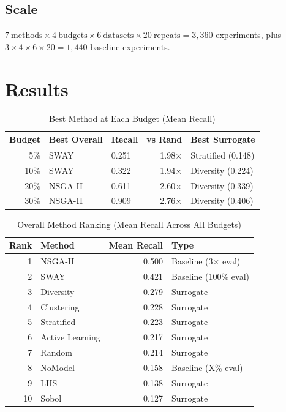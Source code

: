 \documentclass[conference]{IEEEtran}
\begin{document}
\subsection{Scale}

$7~\text{methods} \times 4~\text{budgets} \times 6~\text{datasets} \times 20~\text{repeats} = 3{,}360$ experiments, plus $3 \times 4 \times 6 \times 20 = 1{,}440$ baseline experiments.

\section{Results}
\label{sec:results}

\begin{table}[htbp]
\caption{Best Method at Each Budget (Mean Recall)}
\label{tab:best}
\centering
\begin{tabular}{rllrl}
\toprule
Budget & Best Overall & Recall & vs Rand & Best Surrogate \\
\midrule
5\% & SWAY & 0.251 & 1.98$\times$ & Stratified (0.148) \\
10\% & SWAY & 0.322 & 1.94$\times$ & Diversity (0.224) \\
20\% & NSGA-II & 0.611 & 2.60$\times$ & Diversity (0.339) \\
30\% & NSGA-II & 0.909 & 2.76$\times$ & Diversity (0.406) \\
\bottomrule
\end{tabular}
\end{table}

\begin{table}[htbp]
\caption{Overall Method Ranking (Mean Recall Across All Budgets)}
\label{tab:ranking}
\centering
\begin{tabular}{rlrl}
\toprule
Rank & Method & Mean Recall & Type \\
\midrule
1 & NSGA-II & 0.500 & Baseline (3$\times$ eval) \\
2 & SWAY & 0.421 & Baseline (100\% eval) \\
\midrule
3 & Diversity & 0.279 & Surrogate \\
4 & Clustering & 0.228 & Surrogate \\
5 & Stratified & 0.223 & Surrogate \\
6 & Active Learning & 0.217 & Surrogate \\
7 & Random & 0.214 & Surrogate \\
\midrule
8 & NoModel & 0.158 & Baseline (X\% eval) \\
9 & LHS & 0.138 & Surrogate \\
10 & Sobol & 0.127 & Surrogate \\
\bottomrule
\end{tabular}
\end{table}
\end{document}

